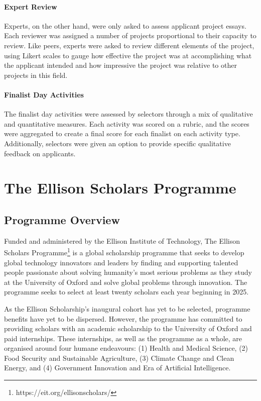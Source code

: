 \paragraph{Expert Review} 
Experts, on the other hand, were only asked to assess applicant project essays. Each reviewer was assigned a number of projects proportional to their capacity to review. Like peers, experts were asked to review different elements of the project, using Likert scales to gauge how effective the project was at accomplishing what the applicant intended and how impressive the project was relative to other projects in this field. 

\paragraph{Finalist Day Activities}
The finalist day activities were assessed by selectors through a mix of qualitative and quantitative measures. Each activity was scored on a rubric, and the scores were aggregated to create a final score for each finalist on each activity type. Additionally, selectors were given an option to provide specific qualitative feedback on applicants.

\section{The Ellison Scholars Programme}\label{ssec:ellison}
\subsection{Programme Overview}
Funded and administered by the Ellison Institute of Technology, The Ellison Scholars Programme\footnote{https://eit.org/ellisonscholars/} is a global scholarship programme that seeks to develop global technology innovators and leaders by finding and supporting talented people passionate about solving humanity’s most serious problems as they study at the University of Oxford and solve global problems through innovation. The programme seeks to select at least twenty scholars each year beginning in 2025.

As the Ellison Scholarship's inaugural cohort has yet to be selected, programme benefits have yet to be dispersed. However, the programme has committed to providing scholars with an academic scholarship to the University of Oxford and paid internships. These internships, as well as the programme as a whole, are organised around four humane endeavours: (1) Health and Medical Science, (2) Food Security and Sustainable Agriculture, (3) Climate Change and Clean Energy, and (4) Government Innovation and Era of Artificial Intelligence.


